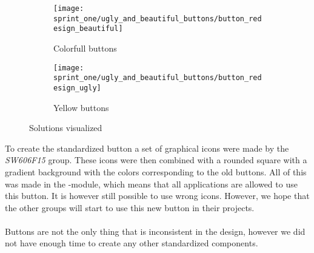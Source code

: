 \begin{figure}[!htbp]
    \centering

    \begin{subfigure}[t]{0.3\textwidth}
    	\centering
        \texttt{[image: sprint\_one/ugly\_and\_beautiful\_buttons/button\_redesign\_beautiful]}
        \caption{Colorfull buttons}
        \label{fig:ugly_and_beautiful_buttons_example_one}
    \end{subfigure}
    \hspace{5em} 
    \begin{subfigure}[t]{0.3\textwidth}
    	\centering
        \texttt{[image: sprint\_one/ugly\_and\_beautiful\_buttons/button\_redesign\_ugly]}
        \caption{Yellow buttons}
        \label{fig:ugly_and_beautiful_buttons_example_two}
    \end{subfigure}
    
    \caption{Solutions visualized}
    \label{fig:ugly_and_beautiful_buttons_example_solution}
\end{figure}

To create the standardized button a set of graphical icons were made by the \emph{SW606F15} group. These icons were then combined with a rounded square with a gradient background with the colors corresponding to the old buttons. All of this was made in the -module, which means that all applications are allowed to use this button. It is however still possible to use wrong icons. However, we hope that the other groups will start to use this new button in their projects.
\\\\
Buttons are not the only thing that is inconsistent in the design, however we did not have enough time to create any other standardized components. 
